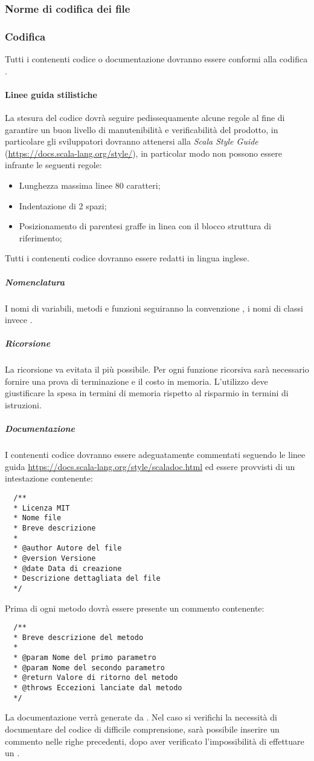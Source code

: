 \documentclass{scalatekids-article}
\begin{document}
\subsubsection{Norme di codifica dei file}
\subsubsection{Codifica}
Tutti i  contenenti codice o documentazione dovranno essere conformi alla
codifica .
\paragraph{Linee guida stilistiche}
La stesura del codice dovrà seguire pedissequamente alcune regole al fine di
garantire un buon livello di manutenibilità e verificabilità del prodotto, in
particolare gli sviluppatori dovranno attenersi alla \textit{Scala Style Guide}
(\url{https://docs.scala-lang.org/style/}), in particolar modo non possono
essere infrante le seguenti regole:
\begin{itemize}
\item Lunghezza massima linee 80 caratteri;
\item Indentazione di 2 spazi;
\item Posizionamento di parentesi graffe in linea con il blocco struttura di
  riferimento;
\end{itemize}
Tutti i  contenenti codice dovranno essere redatti in lingua inglese.
\subparagraph{Nomenclatura}
I nomi di variabili, metodi e funzioni seguiranno la convenzione
\textit{}, i nomi di classi invece
\textit{}.
\subparagraph{Ricorsione}
La ricorsione va evitata il più possibile. Per ogni funzione ricorsiva sarà
necessario fornire una prova di terminazione e il costo in memoria. L'utilizzo
deve giustificare la spesa in termini di memoria rispetto al risparmio in
termini di istruzioni.
\subparagraph{Documentazione}
I  contenenti codice dovranno essere adeguatamente commentati seguendo le
linee guida  \url{https://docs.scala-lang.org/style/scaladoc.html} ed essere provvisti di un
intestazione contenente:
\begin{lstlisting}
  /**
  * Licenza MIT
  * Nome file
  * Breve descrizione
  *
  * @author Autore del file
  * @version Versione
  * @date Data di creazione
  * Descrizione dettagliata del file
  */
\end{lstlisting}
Prima di ogni metodo dovrà essere presente un commento  contenente:
\begin{lstlisting}
  /**
  * Breve descrizione del metodo
  *
  * @param Nome del primo parametro
  * @param Nome del secondo parametro
  * @return Valore di ritorno del metodo
  * @throws Eccezioni lanciate dal metodo
  */
\end{lstlisting}
La documentazione verrà generate da . Nel caso si verifichi la
necessità di documentare del codice di difficile comprensione, sarà possibile
inserire un commento nelle righe precedenti, dopo aver verificato
l'impossibilità di effettuare un .
\end{document}
